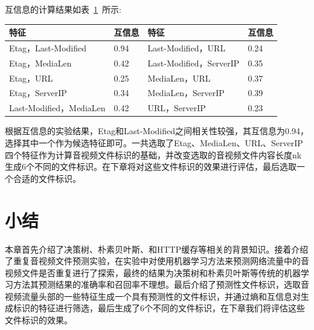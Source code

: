 互信息的计算结果如表~\ref{tab:Featuremutual}~所示:
\begin{table}[!htbp]
    \label{tab:Featuremutual}
    \centering
    \footnotesize%
    \setlength{\tabcolsep}{4pt}%
    \renewcommand{\arraystretch}{1.2}%
    \begin{tabular}{ll|ll}
        \hline
       特征&互信息&特征&互信息\\
        \hline
         Etag，Last-Modified&0.94&Last-Modified，URL&0.24\\
        Etag，MediaLen&0.42&Last-Modified，ServerIP&0.35\\
        Etag，URL&0.25&MediaLen，URL&0.37\\
        Etag，ServerIP&0.34&MediaLen，ServerIP&0.39\\
        Last-Modified，MediaLen&0.42&URL，ServerIP&0.23\\
        \hline
    \end{tabular}
\end{table}

根据互信息的实验结果，Etag和Last-Modified之间相关性较强，其互信息为0.94，选择其中一个作为候选特征即可。一共选取了Etag、MediaLen、URL、ServerIP四个特征作为计算音视频文件标识的基础，并改变选取的音视频文件内容长度nk生成6个不同的文件标识。在下章将对这些文件标识的效果进行评估，最后选取一个合适的文件标识。
\section{小结}
本章首先介绍了决策树、朴素贝叶斯、和HTTP缓存等相关的背景知识。接着介绍了重复音视频文件预测实验，在实验中对使用机器学习方法来预测网络流量中的音视频文件是否重复进行了探索，最终的结果为决策树和朴素贝叶斯等传统的机器学习方法其预测结果的准确率和召回率不理想。最后介绍了预测性文件标识，选取音视频流量头部的一些特征生成一个具有预测性的文件标识，并通过熵和互信息对生成标识的特征进行筛选，最后生成了6个不同的文件标识，在下章我们将评估这些文件标识的效果。

